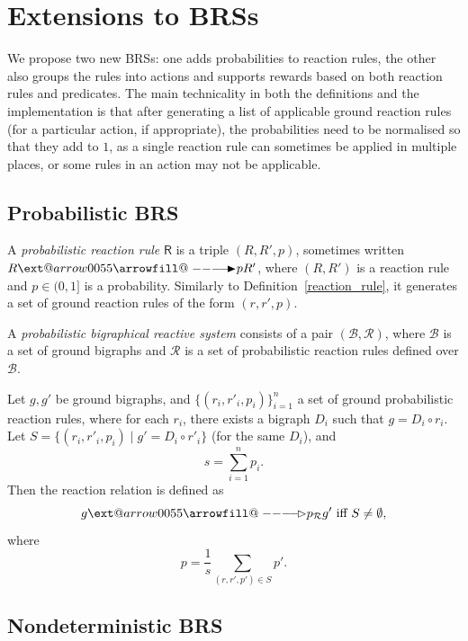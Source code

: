 \documentclass[runningheads]{llncs}
\makeatletter
\providecommand\longrightarrowRHD{\relbar\joinrel\relbar\joinrel\mathrel\RHD}
\providecommand\longrightarrowrhd{\relbar\joinrel\relbar\joinrel\mathrel\rhd}
\providecommand*\xrightarrowRHD[2][]{\ext@arrow 0055{\arrowfill@\relbar\relbar\longrightarrowRHD}{#1}{#2}}
\providecommand*\xrightarrowrhd[2][]{\ext@arrow 0055{\arrowfill@\relbar\relbar\longrightarrowrhd}{#1}{#2}}
\makeatother
\begin{document}
\section{Extensions to BRSs} \label{extensions}

We propose two new BRSs: one adds probabilities to reaction rules, the other
also groups the rules into actions and supports rewards based on both reaction
rules and predicates. The main technicality in both the definitions and the
implementation is that after generating a list of applicable ground reaction
rules (for a particular action, if appropriate), the probabilities need to be
normalised so that they add to $1$, as a single reaction rule can sometimes be
applied in multiple places, or some rules in an action may not be applicable.

\subsection{Probabilistic BRS}

\begin{definition}
  A \emph{probabilistic reaction rule} $\mathsf{R}$ is a triple $(R, R', p)$,
  sometimes written $R \xrightarrowRHD{p} R'$, where $(R, R')$ is a reaction
  rule and $p \in (0, 1]$ is a probability. Similarly to
  Definition~\ref{reaction_rule}, it generates a set of ground reaction rules of
  the form $(r, r', p)$.
\end{definition}

\begin{definition}
  A \emph{probabilistic bigraphical reactive system} consists of a pair
  $(\mathcal{B}, \mathcal{R})$, where $\mathcal{B}$ is a set of ground bigraphs
  and $\mathcal{R}$ is a set of probabilistic reaction rules defined over
  $\mathcal{B}$.

  Let $g, g'$ be ground bigraphs, and $\{ (r_i, r'_i, p_i) \}_{i=1}^n$ a set of
  ground probabilistic reaction rules, where for each $r_i$, there exists a
  bigraph $D_i$ such that $g = D_i \circ r_i$. Let $S = \{ (r_i, r'_i, p_i) \mid
  g' = D_i \circ r'_i \}$ (for the same $D_i$), and
  \[ s = \sum_{i=1}^n p_i. \]
  Then the reaction relation is defined as
  \[ g \xrightarrowrhd{p}_{\mathcal{R}} g' \text{ iff } S \ne \emptyset, \]
  where
  \[ p = \frac{1}{s}\sum_{(r, r', p') \in S} p'. \]
\end{definition}

\subsection{Nondeterministic BRS}
\end{document}
